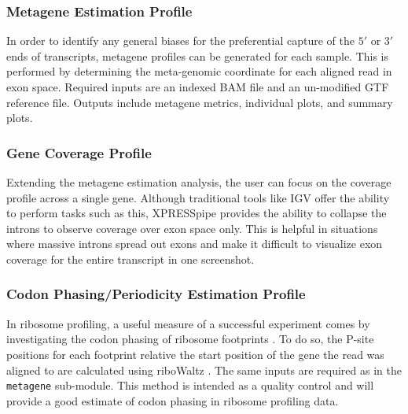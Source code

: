 \documentclass[10pt, oneside]{article}
\begin{document}
\subsubsection{Metagene Estimation Profile}
In order to identify any general biases for the preferential capture of the $5'$ or $3'$ ends of transcripts, metagene profiles can be generated for each sample. This is performed by determining the meta-genomic coordinate for each aligned read in exon space. Required inputs are an indexed BAM file and an un-modified GTF reference file. Outputs include metagene metrics, individual plots, and summary plots.

\subsubsection{Gene Coverage Profile}
Extending the metagene estimation analysis, the user can focus on the coverage profile across a single gene. Although traditional tools like IGV \cite{igv} offer the ability to perform tasks such as this, XPRESSpipe provides the ability to collapse the introns to observe coverage over exon space only. This is helpful in situations where massive introns spread out exons and make it difficult to visualize exon coverage for the entire transcript in one screenshot.

\subsubsection{Codon Phasing/Periodicity Estimation Profile}
In ribosome profiling, a useful measure of a successful experiment comes by investigating the codon phasing of ribosome footprints \cite{ingolia_meth}. To do so, the P-site positions for each footprint relative the start position of the gene the read was aligned to are calculated using riboWaltz \cite{ribowaltz}. The same inputs are required as in the \texttt{metagene} sub-module. This method is intended as a quality control and will provide a good estimate of codon phasing in ribosome profiling data.
\end{document}

